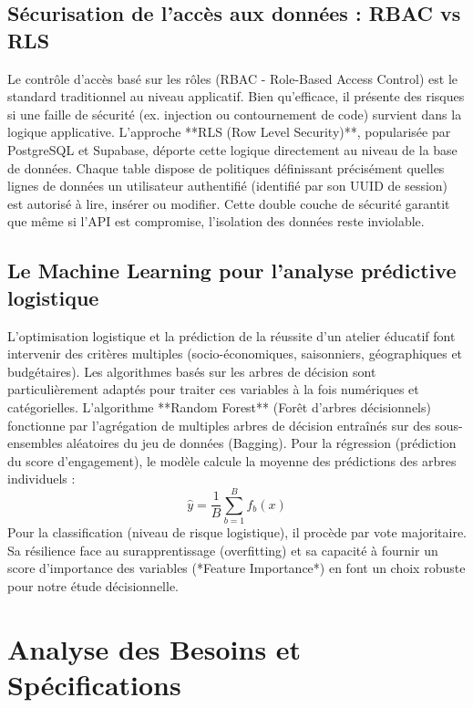 \documentclass[12pt,a4paper]{report}
\begin{document}
\section{Sécurisation de l'accès aux données : RBAC vs RLS}
Le contrôle d'accès basé sur les rôles (RBAC - Role-Based Access Control) est le standard traditionnel au niveau applicatif. Bien qu'efficace, il présente des risques si une faille de sécurité (ex. injection ou contournement de code) survient dans la logique applicative.
L'approche **RLS (Row Level Security)**, popularisée par PostgreSQL et Supabase, déporte cette logique directement au niveau de la base de données. Chaque table dispose de politiques définissant précisément quelles lignes de données un utilisateur authentifié (identifié par son UUID de session) est autorisé à lire, insérer ou modifier. Cette double couche de sécurité garantit que même si l'API est compromise, l'isolation des données reste inviolable.

\section{Le Machine Learning pour l'analyse prédictive logistique}
L'optimisation logistique et la prédiction de la réussite d'un atelier éducatif font intervenir des critères multiples (socio-économiques, saisonniers, géographiques et budgétaires). Les algorithmes basés sur les arbres de décision sont particulièrement adaptés pour traiter ces variables à la fois numériques et catégorielles.
L'algorithme **Random Forest** (Forêt d'arbres décisionnels) fonctionne par l'agrégation de multiples arbres de décision entraînés sur des sous-ensembles aléatoires du jeu de données (Bagging). Pour la régression (prédiction du score d'engagement), le modèle calcule la moyenne des prédictions des arbres individuels :
\begin{equation}
    \hat{y} = \frac{1}{B} \sum_{b=1}^{B} f_b(x)
\end{equation}
Pour la classification (niveau de risque logistique), il procède par vote majoritaire. Sa résilience face au surapprentissage (overfitting) et sa capacité à fournir un score d'importance des variables (*Feature Importance*) en font un choix robuste pour notre étude décisionnelle.

\chapter{Analyse des Besoins et Spécifications}
\end{document}
